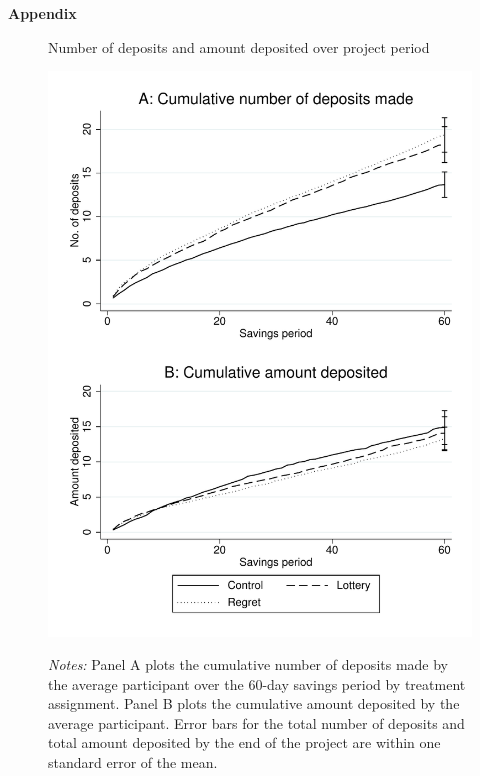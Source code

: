 \documentclass[12pt]{article}
\begin{document}




\newpage

\textbf{Appendix}

	
	
	
	
	
	
	

	\clearpage

	\begin{figure}[h]
		\centering
		\caption{Number of deposits and amount deposited over project period}
		\includegraphics[height=0.85\textheight]{../../figures/line-cumdeposits.pdf}
		\label{fig:line-cumdeposits}
		\caption*{\footnotesize \emph{Notes:} Panel A plots the cumulative number of deposits made by the average participant over the 60-day savings period by treatment assignment. Panel B plots the cumulative amount deposited by the average participant. Error bars for the total number of deposits and total amount deposited by the end of the project are within one standard error of the mean.}
	\end{figure}
\end{document}
